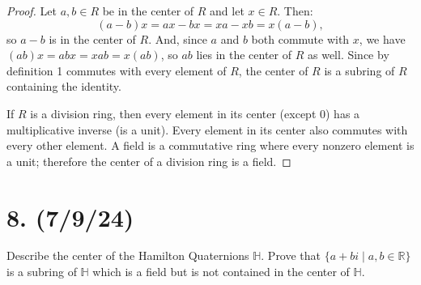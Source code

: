 \documentclass{article}
\begin{document}
\begin{proof}
    Let $a, b \in R$ be in the center of $R$ and let $x \in R$. Then:
    \begin{equation*}
        (a - b)x = ax - bx = xa - xb = x(a - b),
    \end{equation*}
    so $a - b$ is in the center of $R$. And, since $a$ and $b$ both commute with $x$, we have $(ab)x = abx = xab = x(ab)$, so $ab$ lies in the center of $R$ as well. Since by definition 1 commutes with every element of $R$, the center of $R$ is a subring of $R$ containing the identity.

    If $R$ is a division ring, then every element in its center (except 0) has a multiplicative inverse (is a unit). Every element in its center also commutes with every other element. A field is a commutative ring where every nonzero element is a unit; therefore the center of a division ring is a field.
\end{proof}

\section*{8. (7/9/24)}

Describe the center of the Hamilton Quaternions $\mathbb{H}$. Prove that $\{ a + bi \mid a, b \in \mathbb{R} \}$ is a subring of $\mathbb{H}$ which is a field but is not contained in the center of $\mathbb{H}$.
\end{document}
